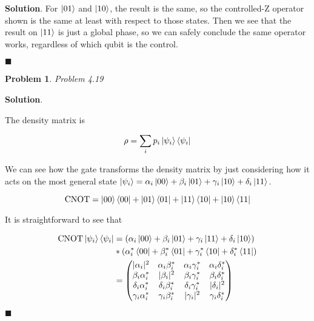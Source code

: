 \documentclass[12pt]{article}
\newtheorem{p}{Problem}
\theoremstyle{definition}
\newenvironment{s}{%
        \begin{trivlist} \item \textbf{Solution}. }{%
            \hspace*{\fill} $\blacksquare$\end{trivlist}}%
\begin{document}
{\begin{s}
For $\ket{01}$ and $\ket{10}$, the result is the same, so the controlled-Z operator shown is the same at least with respect to those states. Then we see that the result on $\ket{11}$ is just a global phase, so we can safely conclude the same operator works, regardless of which qubit is the control. 

\end{s}


\begin{p}
Problem 4.19
\end{p}

\begin{s}

The density matrix is

\begin{equation*}
\rho = \sum_{i}p_{i}\ket{\psi_{i}}\bra{\psi_{i}}
\end{equation*}

We can see how the gate transforms the density matrix by just considering how it acts on the most general state $\ket{\psi_{i}} = \alpha_{i}\ket{00} + \beta_{i}\ket{01} + \gamma_{i}\ket{10} + \delta_{i}\ket{11}$.

\begin{equation*}
\mathrm{CNOT} = \ket{00}\bra{00} + \ket{01}\bra{01} + \ket{11}\bra{10} + \ket{10}\bra{11}
\end{equation*}

It is straightforward to see that

\begin{align*}
\mathrm{CNOT}\ket{\psi_{i}}\bra{\psi_{i}} &= \left(\alpha_{i}\ket{00} + \beta_{i}\ket{01} + \gamma_{i}\ket{11} + \delta_{i}\ket{10}\right)\\
&* \left(\alpha_{i}^{*}\bra{00} + \beta_{i}^{*}\bra{01} + \gamma_{i}^{*}\bra{10} + \delta_{i}^{*}\bra{11}\right)\\
&=
\begin{pmatrix}
|\alpha_{i}|^{2} & \alpha_{i}\beta_{i}^{*} & \alpha_{i}\gamma_{i}^{*} & \alpha_{i}\delta_{i}^{*} \\
\beta_{i}\alpha_{i}^{*} & |\beta_{i}|^{2} & \beta_{i}\gamma_{i}^{*} & \beta_{i}\delta_{i}^{*} \\
\delta_{i}\alpha_{i}^{*} & \delta_{i}\beta_{i}^{*} & \delta_{i}\gamma_{i}^{*} & |\delta_{i}|^{2} \\
\gamma_{i}\alpha_{i}^{*} & \gamma_{i}\beta_{i}^{*} & |\gamma_{i}|^{2} & \gamma_{i}\delta_{i}^{*} 
\end{pmatrix}
\end{align*}



\end{s}
\end{document}
